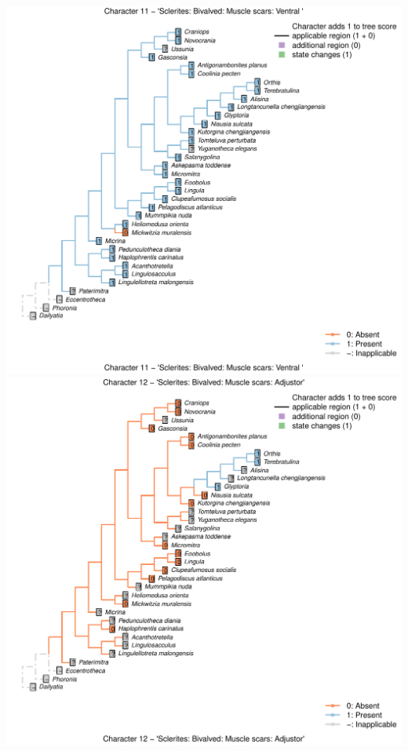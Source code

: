 \documentclass[]{book}
\theoremstyle{definition}
\theoremstyle{definition}
\theoremstyle{definition}
\theoremstyle{remark}
\begin{document}
\includegraphics{Brachiopod_phylogeny_files/figure-latex/unnamed-chunk-4-11.pdf}
\includegraphics{Brachiopod_phylogeny_files/figure-latex/unnamed-chunk-4-12.pdf}
\end{document}
